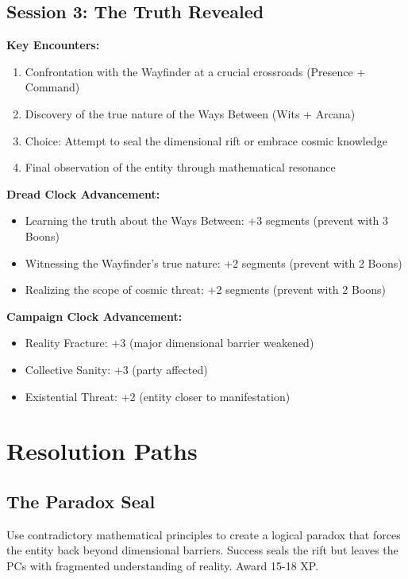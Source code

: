 \documentclass[11pt]{article}
\begin{document}
\subsection{Session 3: The Truth Revealed}

\textbf{Key Encounters:}
\begin{enumerate}
\item Confrontation with the Wayfinder at a crucial crossroads (Presence + Command)
\item Discovery of the true nature of the Ways Between (Wits + Arcana)
\item Choice: Attempt to seal the dimensional rift or embrace cosmic knowledge
\item Final observation of the entity through mathematical resonance
\end{enumerate}

\textbf{Dread Clock Advancement:}
\begin{itemize}
\item Learning the truth about the Ways Between: +3 segments (prevent with 3 Boons)
\item Witnessing the Wayfinder's true nature: +2 segments (prevent with 2 Boons)
\item Realizing the scope of cosmic threat: +2 segments (prevent with 2 Boons)
\end{itemize}

\textbf{Campaign Clock Advancement:}
\begin{itemize}
\item Reality Fracture: +3 (major dimensional barrier weakened)
\item Collective Sanity: +3 (party affected)
\item Existential Threat: +2 (entity closer to manifestation)
\end{itemize}

\section{Resolution Paths}

\subsection{The Paradox Seal}

Use contradictory mathematical principles to create a logical paradox that forces the entity back beyond dimensional barriers. Success seals the rift but leaves the PCs with fragmented understanding of reality. Award 15-18 XP.
\end{document}

